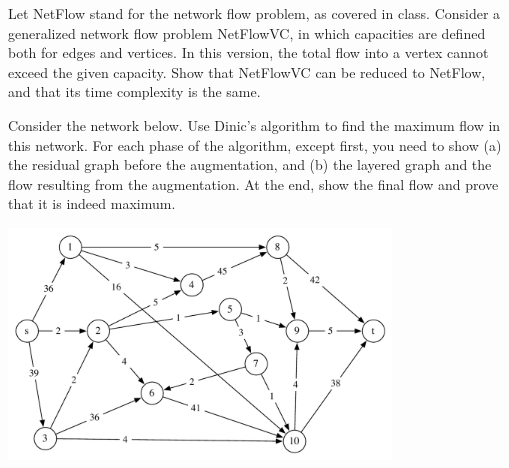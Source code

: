 \documentclass[11pt]{article}
\begin{document}
\begin{problem} 
Let {\sf NetFlow} stand for the network flow problem, as covered in class. Consider a generalized network flow problem {\sf NetFlowVC}, in which capacities are defined both for edges and vertices. In this version, the total flow into a vertex cannot exceed the given capacity. Show that {\sf NetFlowVC} can be reduced to {\sf NetFlow}, and that its time complexity is the same.
\end{problem}



\begin{problem} 
Consider the network below. Use Dinic's algorithm to find the maximum flow in this network. For each phase of the algorithm, except first, you need to show (a) the residual graph before the augmentation, and (b) the layered graph and the flow resulting from the augmentation. At the end, show the final flow and prove that it is indeed maximum.

\noindent
\begin{center}
\includegraphics[width=4in]{hw3_dinic.pdf} %
\end{center}
\end{problem}


\vskip 0.2in
\section{}
\end{document}
